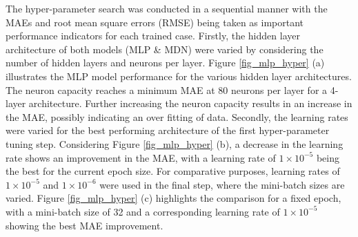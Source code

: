 \documentclass[a4paper,fleqn]{cas-sc}
\begin{document}
The hyper-parameter search was conducted in a sequential manner with the MAEs and root mean square errors (RMSE) being taken as important performance indicators for each trained case. Firstly, the hidden layer architecture of both models (MLP \& MDN) were varied by considering the number of hidden layers and neurons per layer. Figure \ref{fig_mlp_hyper} (a) illustrates the MLP model performance for the various hidden layer architectures. The neuron capacity reaches a minimum MAE at 80 neurons per layer for a 4-layer architecture. Further increasing the neuron capacity results in an increase in the MAE, possibly indicating an over fitting of data. Secondly, the learning rates were varied for the best performing architecture of the first hyper-parameter tuning step. Considering Figure \ref{fig_mlp_hyper} (b), a decrease in the learning rate shows an improvement in the MAE, with a learning rate of $1\times10^{-5}$ being the best for the current epoch size. For comparative purposes, learning rates of $1\times10^{-5}$ and $1\times10^{-6}$ were used in the final step, where the mini-batch sizes are varied. Figure \ref{fig_mlp_hyper} (c) highlights the comparison for a fixed epoch, with a mini-batch size of 32 and a corresponding learning rate of $1\times10^{-5}$ showing the best MAE improvement.\\
\end{document}
